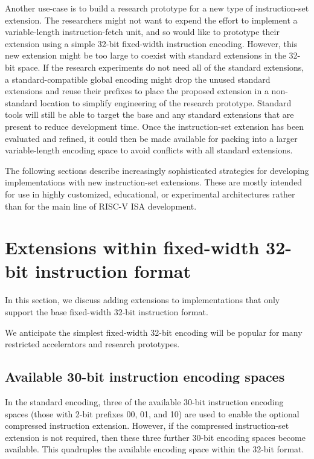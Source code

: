Another use-case is to build a research prototype for a new type of
instruction-set extension.  The researchers might not want to expend
the effort to implement a variable-length instruction-fetch unit, and
so would like to prototype their extension using a simple 32-bit
fixed-width instruction encoding.  However, this new extension might
be too large to coexist with standard extensions in the 32-bit space.
If the research experiments do not need all of the standard
extensions, a standard-compatible global encoding might drop the
unused standard extensions and reuse their prefixes to place the
proposed extension in a non-standard location to simplify engineering
of the research prototype.  Standard tools will still be able to
target the base and any standard extensions that are present to reduce
development time.  Once the instruction-set extension has been
evaluated and refined, it could then be made available for packing
into a larger variable-length encoding space to avoid conflicts with
all standard extensions.

The following sections describe increasingly sophisticated strategies
for developing implementations with new instruction-set extensions.
These are mostly intended for use in highly customized, educational,
or experimental architectures rather than for the main line of RISC-V
ISA development.

\section{Extensions within fixed-width 32-bit instruction format}
\label{fix32b}

In this section, we discuss adding extensions to implementations that
only support the base fixed-width 32-bit instruction format.

\begin{commentary}
We anticipate the simplest fixed-width 32-bit encoding will be popular for
many restricted accelerators and research prototypes.
\end{commentary}

\subsection*{Available 30-bit instruction encoding spaces}

In the standard encoding, three of the available 30-bit instruction
encoding spaces (those with 2-bit prefixes 00, 01, and 10) are used to
enable the optional compressed instruction extension.  However, if the
compressed instruction-set extension is not required, then these three
further 30-bit encoding spaces become available.  This quadruples the
available encoding space within the 32-bit format.

